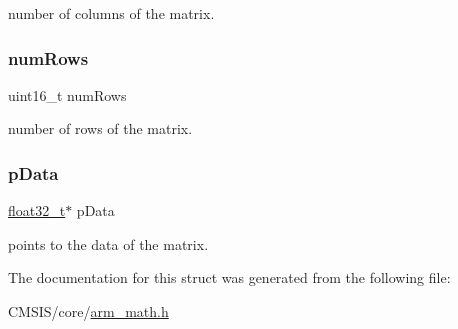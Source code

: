 number of columns of the matrix. \mbox{\label{structarm__matrix__instance__f32_a1bcf80ccdc2acc29198f1592ae300390}} 
\subsubsection{\texorpdfstring{numRows}{numRows}}
{\footnotesize\ttfamily uint16\+\_\+t num\+Rows}

number of rows of the matrix. \mbox{\label{structarm__matrix__instance__f32_af5c3a2f15c98850cdcfbe6f87e5ac5df}} 
\subsubsection{\texorpdfstring{pData}{pData}}
{\footnotesize\ttfamily \mbox{\hyperlink{arm__math_8h_a4611b605e45ab401f02cab15c5e38715}{float32\+\_\+t}}$\ast$ p\+Data}

points to the data of the matrix. 

The documentation for this struct was generated from the following file\+:\begin{DoxyCompactItemize}
\item 
C\+M\+S\+I\+S/core/\mbox{\hyperlink{arm__math_8h}{arm\+\_\+math.\+h}}\end{DoxyCompactItemize}
